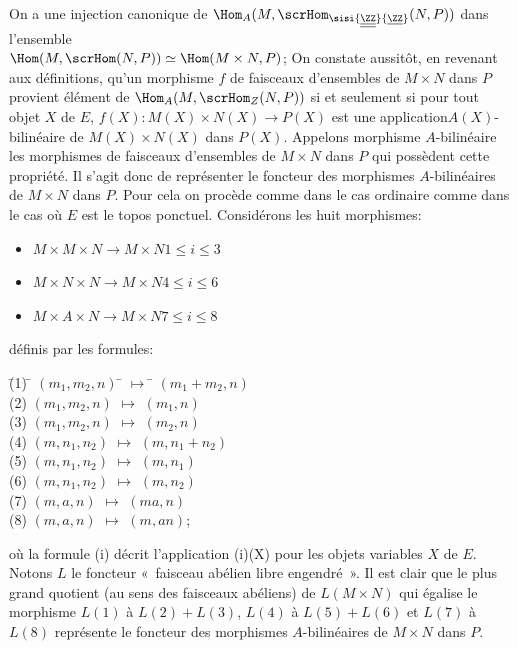 \documentclass[10pt]{../fichiers-configuration-latex/smfart}
\begin{document}
On a une injection canonique de $\Hom_A(M,\scrHom_{\sisi{\underline{\underline{\ZZ}}}{\underline{\ZZ}}}(N,P))$ dans
l'ensemble \\ $\Hom(M,\scrHom(N,P))\simeq \Hom(M\times N, P)$; On
constate aussitôt, en revenant aux définitions, qu'un morphisme $f$
de faisceaux d'ensembles de $M\times N$ dans $P$ provient 
élément de $\Hom_A(M,\scrHom_Z(N,P))$ si et seulement si pour tout
objet $X$ de $E$, $f(X):M(X)\times N(X)\rightarrow P(X)$ est une
application\pageoriginale $A(X)$-bilinéaire de $M(X)\times N(X)$
dans $P(X)$. Appelons morphisme $A$-bilinéaire les morphismes de
faisceaux d'ensembles de $M\times N$ dans $P$ qui possèdent cette
propriété. Il s'agit donc de représenter le foncteur des morphismes
$A$-bilinéaires de $M\times N$ dans $P$. Pour cela on procède comme
dans le cas ordinaire \ie comme dans le cas où $E$ est le topos
ponctuel. Considérons les huit morphismes:
\begin{itemize}
\item[(i):] $M\times M\times N \longrightarrow M\times N$\qquad $1\leq
i\leq 3$

\item[(i):] $M\times N\times N\longrightarrow M\times N$\qquad $4\leq
i\leq 6$

\item[(i):] $M\times A\times N\longrightarrow M\times N$\qquad $7\leq
i\leq 8$
\end{itemize}
définis par les formules:
\begin{tabbing}
\quad\= (1) \= $(m_1, m_2, n)$ \= $\longmapsto$ \= $(m_1+m_2, n)$\\
\> (2) \> $(m_1, m_2, n)$ \> $\longmapsto$ \> $(m_1, n)$\\
\> (3) \> $(m_1, m_2, n)$ \> $\longmapsto$ \> $(m_2, n)$\\
\> (4) \> $(m, n_1, n_2)$ \> $\longmapsto$ \> $(m, n_1+n_2)$\\
\> (5) \> $(m, n_1, n_2)$ \> $\longmapsto$ \> $(m, n_1)$\\
\> (6) \> $(m, n_1, n_2)$ \> $\longmapsto$ \> $(m, n_2)$\\
\> (7) \> $(m, a, n)$ \> $\longmapsto$ \> $(ma, n)$\\
\> (8) \> $(m, a, n)$ \> $\longmapsto$ \> $(m, an)$;
\end{tabbing}
où la formule (i) décrit l'application (i)(X) pour les objets
variables $X$ de $E$. Notons $L$ le foncteur « faisceau abélien
libre engendré ». Il est clair que le plus grand quotient (au sens
des faisceaux abéliens) de $L(M\times N)$ qui égalise le morphisme
$L(1)$ à $L(2)+L(3)$, $L(4)$ à $L(5)+L(6)$ et $L(7)$ à $L(8)$
représente le foncteur des morphismes $A$-bilinéaires de $M\times N$
dans $P$.
\end{document}
